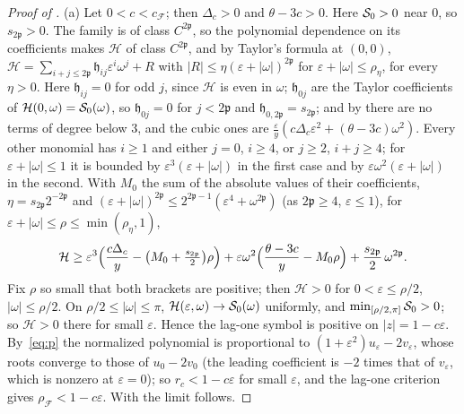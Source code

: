 \documentclass[11pt]{article}
\theoremstyle{definition}
\theoremstyle{remark}
\newcommand{\cF}{\mathcal F}
\newcommand{\rhoF}{\rho_{\cF}}
\newcommand{\cFF}{c_{\cF}}
\begin{document}
\begin{proof}[Proof of ]
(a) Let \(0<c<\cFF\); then \(\Delta_c>0\) and \(\theta-3c>0\).  Here \(\mathcal S_0>0\) near \(0\), so \(s_{2\mathfrak p}>0\).  The family
is of class \(C^{2\mathfrak p}\), so the polynomial dependence on its coefficients makes \(\mathcal H\) of class \(C^{2\mathfrak p}\), and by Taylor's formula at \((0,0)\),
\(\mathcal H=\sum_{i+j\le2\mathfrak p}\mathfrak h_{ij}\varepsilon^i\omega^j+R\) with \(|R|\le\eta(\varepsilon+|\omega|)^{2\mathfrak p}\) for \(\varepsilon+|\omega|\le\rho_\eta\), for every \(\eta>0\).  Here
\(\mathfrak h_{ij}=0\) for odd \(j\), since \(\mathcal H\) is even in \(\omega\); \(\mathfrak h_{0j}\) are the Taylor coefficients of \(\mathcal H(0,\omega)=\mathcal S_0(\omega)\), so
\(\mathfrak h_{0j}=0\) for \(j<2\mathfrak p\) and \(\mathfrak h_{0,2\mathfrak p}=s_{2\mathfrak p}\); and by  there are no terms of degree below \(3\), and the
cubic ones are \(\frac\varepsilon y(c\Delta_c\varepsilon^2+(\theta-3c)\omega^2)\).  Every other monomial has \(i\ge1\) and either \(j=0\), \(i\ge4\), or
\(j\ge2\), \(i+j\ge4\); for \(\varepsilon+|\omega|\le1\) it is bounded by \(\varepsilon^3(\varepsilon+|\omega|)\) in the first case and by \(\varepsilon\omega^2(\varepsilon+|\omega|)\)
in the second.  With \(M_0\) the sum of the absolute values of their coefficients, \(\eta=s_{2\mathfrak p}2^{-2\mathfrak p}\) and
\((\varepsilon+|\omega|)^{2\mathfrak p}\le2^{2\mathfrak p-1}(\varepsilon^4+\omega^{2\mathfrak p})\) (as \(2\mathfrak p\ge4\), \(\varepsilon\le1\)), for \(\varepsilon+|\omega|\le\rho\le\min(\rho_\eta,1)\),
\[
\mathcal H\ge\varepsilon^3\Bigl(\frac{c\Delta_c}y-\bigl(M_0+\tfrac{s_{2\mathfrak p}}2\bigr)\rho\Bigr)+\varepsilon\omega^2\Bigl(\frac{\theta-3c}y-M_0\rho\Bigr)+\frac{s_{2\mathfrak p}}2\,\omega^{2\mathfrak p}.
\]
Fix \(\rho\) so small that both brackets are positive; then \(\mathcal H>0\) for \(0<\varepsilon\le\rho/2\), \(|\omega|\le\rho/2\).  On
\(\rho/2\le|\omega|\le\pi\), \(\mathcal H(\varepsilon,\omega)\to \mathcal S_0(\omega)\) uniformly, and \(\min_{[\rho/2,\pi]}\mathcal S_0>0\); so \(\mathcal H>0\) there for small \(\varepsilon\).
Hence the lag-one symbol is positive on \(|z|=1-c\varepsilon\).  By~\eqref{eq:p} the normalized
polynomial is proportional to \((1+\varepsilon^2)u_\varepsilon-2v_\varepsilon\), whose roots converge to those of \(u_0-2v_0\)
(the leading coefficient is \(-2\) times that of \(v_\varepsilon\), which is nonzero at \(\varepsilon=0\)); so
\(r_c<1-c\varepsilon\) for small \(\varepsilon\), and the lag-one criterion gives \(\rhoF<1-c\varepsilon\).  With
 the limit follows.


\end{proof}
\end{document}
